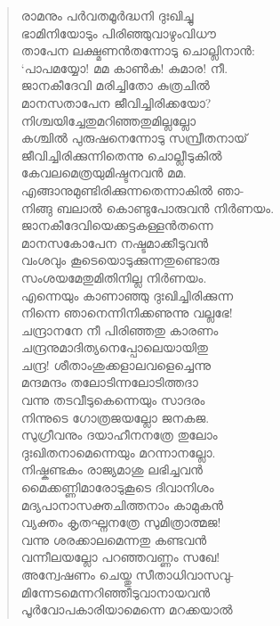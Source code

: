 \begin{verse}
രാമനും പര്‍വതമൂര്‍ദ്ധനി ദുഃഖിച്ചു\\
ഭാമിനിയോടും പിരിഞ്ഞുവാഴുംവിധൗ\\
താപേന ലക്ഷ്മണന്‍തന്നോടു ചൊല്ലിനാന്‍:\\
‘പാപമയ്യോ! മമ കാണ്‍ക! കുമാര! നീ.\\
ജാനകീദേവി മരിച്ചിതോ കുത്രചില്‍\\
മാനസതാപേന ജീവിച്ചിരിക്കയോ?\\
നിശ്ചയിച്ചേതുമറിഞ്ഞതുമില്ലല്ലോ\\
കശ്ചില്‍ പുരുഷനെന്നോടു സമ്പ്രീതനായ്\\
ജീവിച്ചിരിക്കുന്നിതെന്നു ചൊല്ലീടുകില്‍\\
കേവലമെത്രയുമിഷ്ടനവന്‍ മമ.\\
എങ്ങാനുമുണ്ടിരിക്കുന്നതെന്നാകില്‍ ഞാ-\\
നിങ്ങു ബലാല്‍ കൊണ്ടുപോരുവന്‍ നിര്‍ണയം.\\
ജാനകീദേവിയെക്കട്ടകള്ളന്‍തന്നെ\\
മാനസകോപേന നഷ്ടമാക്കീടുവന്‍\\
വംശവും കൂടെയൊടുക്കുന്നതുണ്ടൊരു\\
സംശയമേതുമിതിനില്ല നിര്‍ണയം.\\
എന്നെയും കാണാഞ്ഞു ദുഃഖിച്ചിരിക്കുന്ന\\
നിന്നെ ഞാനെന്നിനിക്കണുന്നു വല്ലഭേ!\\
ചന്ദ്രാനനേ നീ പിരിഞ്ഞതു കാരണം\\
ചന്ദ്രനുമാദിത്യനെപ്പോലെയായിതു\\
ചന്ദ്ര! ശീതാംശുക്കളാലവളെച്ചെന്നു\\
മന്ദമന്ദം തലോടിന്നലോടിത്തദാ\\
വന്നു തടവീടുകെന്നെയും സാദരം\\
നിന്നുടെ ഗോത്രജയല്ലോ ജനകജ.\\
സുഗ്രീവനും ദയാഹീനനത്രേ തുലോം\\
ദുഃഖിതനാമെന്നെയും മറന്നാനല്ലോ.\\
നിഷ്കണ്ടകം രാജ്യമാശു ലഭിച്ചവന്‍\\
മൈക്കണ്ണിമാരോടുകൂടെ ദിവാനിശം\\
മദ്യപാനാസക്തചിത്തനാം കാമുകന്‍\\
വ്യക്തം കൃതഘ്നനത്രേ സുമിത്രാത്മജ!\\
വന്നു ശരക്കാലമെന്നതു കണ്ടവന്‍\\
വന്നീലയല്ലോ പറഞ്ഞവണ്ണം സഖേ!\\
അന്വേഷണം ചെയ്തു സീതാധിവാസവു-\\
മിന്നേടമെന്നറിഞ്ഞീടുവാനായവന്‍\\
പൂര്‍വോപകാരിയാമെന്നെ മറക്കയാല്‍\\

\end{verse}
